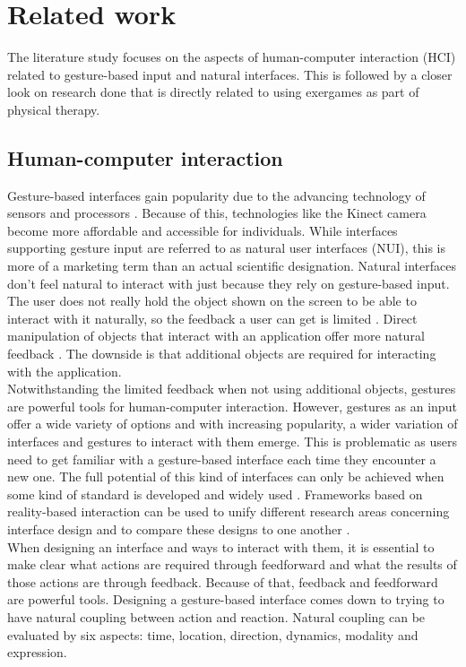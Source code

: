 \chapter{Related work}

The literature study focuses on the aspects of human-computer interaction (HCI) related to gesture-based input and natural interfaces. This is followed by a closer look on research done that is directly related to using exergames as part of physical therapy.

\section{Human-computer interaction}

Gesture-based interfaces gain popularity due to the advancing technology of sensors and processors \cite{Jacob2008}. Because of this, technologies like the Kinect camera become more affordable and accessible for individuals. While interfaces supporting gesture input are referred to as natural user interfaces (NUI), this is more of a marketing term than an actual scientific designation. Natural interfaces don't feel natural to interact with just because they rely on gesture-based input. The user does not really hold the object shown on the screen to be able to interact with it naturally, so the feedback a user can get is limited \cite{Norman2010}. Direct manipulation of objects that interact with an application offer more natural feedback \cite{Shneiderman2010}. The downside is that additional objects are required for interacting with the application.\\

Notwithstanding the limited feedback when not using additional objects, gestures are powerful tools for human-computer interaction. However, gestures as an input offer a wide variety of options and with increasing popularity, a wider variation of interfaces and gestures to interact with them emerge. This is problematic as users need to get familiar with a gesture-based interface each time they encounter a new one. The full potential of this kind of interfaces can only be achieved when some kind of standard is developed and widely used \cite{Norman2010}. Frameworks based on reality-based interaction can be used to unify different research areas concerning interface design and to compare these designs to one another \cite{Jacob2008}.\\

When designing an interface and ways to interact with them, it is essential to make clear what actions are required through feedforward and what the results of those actions are through feedback. Because of that, feedback and feedforward are powerful tools. Designing a gesture-based interface comes down to trying to have natural coupling between action and reaction. Natural coupling can be evaluated by six aspects: time, location, direction, dynamics, modality and expression.\cite{Wensveen2004}\\

